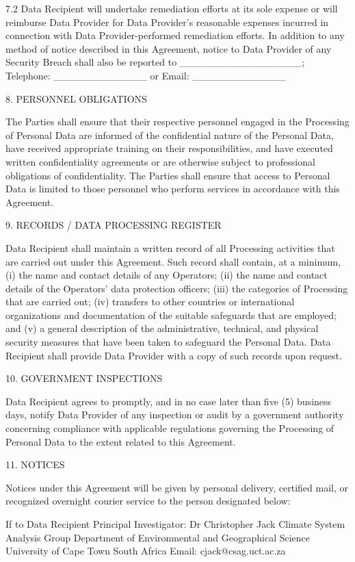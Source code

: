 \documentclass[12pt,letterpaper]{article}
\begin{document}
7.2	Data Recipient will undertake remediation efforts at its sole expense or will reimburse Data Provider for Data Provider’s reasonable expenses incurred in connection with Data Provider-performed remediation efforts. In addition to any method of notice described in this Agreement, notice to Data Provider of any Security Breach shall also be reported to \_\_\_\_\_\_\_\_\_\_\_\_\_\_\_\_\_; Telephone: \_\_\_\_\_\_\_\_\_\_\_\_\_ or Email: \_\_\_\_\_\_\_\_\_\_\_\_\_ 

8.	PERSONNEL OBLIGATIONS	

The Parties shall ensure that their respective personnel engaged in the Processing of Personal Data are informed of the confidential nature of the Personal Data, have received appropriate training on their responsibilities, and have executed written confidentiality agreements or are otherwise subject to professional obligations of confidentiality. The Parties shall ensure that access to Personal Data is limited to those personnel who perform services in accordance with this Agreement.

9.	RECORDS / DATA PROCESSING REGISTER

Data Recipient shall maintain a written record of all Processing activities that are carried out under this Agreement. Such record shall contain, at a minimum, (i) the name and contact details of any Operators; (ii) the name and contact details of the Operators’ data protection officers; (iii) the categories of Processing that are carried out; (iv) transfers to other countries or international organizations and documentation of the suitable safeguards that are employed; and (v) a general description of the administrative, technical, and physical security measures that have been taken to safeguard the Personal Data. Data Recipient shall provide Data Provider with a copy of such records upon request.

10.	GOVERNMENT INSPECTIONS

Data Recipient agrees to promptly, and in no case later than five (5) business days, notify Data Provider of any inspection or audit by a government authority concerning compliance with applicable regulations governing the Processing of Personal Data to the extent related to this Agreement.

11.	NOTICES

Notices under this Agreement will be given by personal delivery, certified mail, or recognized overnight courier service to the person designated below:

If to Data Recipient Principal Investigator: Dr Christopher Jack Climate System Analysis Group Department of Environmental and Geographical Science University of Cape Town South Africa Email: cjack@csag.uct.ac.za 
\end{document}

